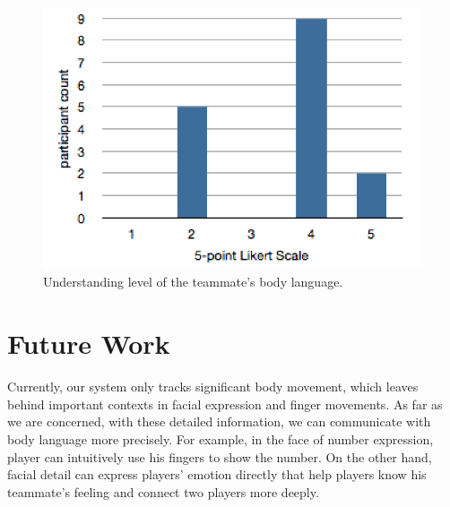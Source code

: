 \documentclass{chi-ext}
\begin{document}
\begin{figure}
  \centering
  \includegraphics[width=0.9\linewidth]{figures/2_BLunderstand.png}
  \caption{Understanding level of the teammate's body language.}
  \label{fig:2_BLunderstand}
\end{figure}






\section{Future Work}

Currently, our system only tracks significant body movement, which leaves behind important contexts in facial expression and finger movements. As far as we are concerned, with these detailed information, we can communicate with body language more precisely. For example, in the face of number expression, player can intuitively use his fingers to show the number. On the other hand, facial detail can express players' emotion directly that help players know his teammate's feeling and connect two players more deeply.
\end{document}
